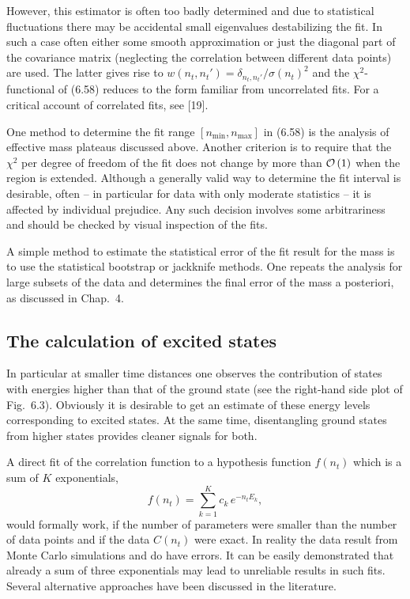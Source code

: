 However, this estimator is often too badly determined and due to statistical
fluctuations there may be accidental small eigenvalues destabilizing the fit. In
such a case often either some smooth approximation or just the diagonal part of
the covariance matrix (neglecting the correlation between different data
points) are used. The latter gives rise to $w(n_t, n_t') =
\delta_{n_t,n_t'}/\sigma(n_t)^2$ and the $\chi^2$-functional of (6.58) reduces
to the form familiar from uncorrelated fits. For a critical account of
correlated fits, see [19].

One method to determine the fit range $[n_{\min}, n_{\max}]$ in (6.58) is the
analysis of effective mass plateaus discussed above. Another criterion is to
require that the $\chi^2$ per degree of freedom of the fit does not change by
more than $\mathcal{O}\left(1\right)$ when the region is extended. Although a generally valid
way to determine the fit interval is desirable, often -- in particular for data
with only moderate statistics -- it is affected by individual prejudice. Any
such decision involves some arbitrariness and should be checked by visual
inspection of the fits.

A simple method to estimate the statistical error of the fit result for the
mass is to use the statistical bootstrap or jackknife methods. One repeats the
analysis for large subsets of the data and determines the final error of the
mass a posteriori, as discussed in Chap.~4.

\subsection{The calculation of excited states}

In particular at smaller time distances one observes the contribution of states
with energies higher than that of the ground state (see the right-hand side
plot of Fig.~6.3). Obviously it is desirable to get an estimate of these energy
levels corresponding to excited states. At the same time, disentangling ground
states from higher states provides cleaner signals for both.

A direct fit of the correlation function to a hypothesis function $f(n_t)$
which is a sum of $K$ exponentials,
\begin{equation}
  f(n_t) = \sum_{k=1}^{K} c_k\, e^{-n_t E_k} ,
\end{equation}
would formally work, if the number of parameters were smaller than the number
of data points and if the data $C(n_t)$ were exact. In reality the data result
from Monte Carlo simulations and do have errors. It can be easily demonstrated
that already a sum of three exponentials may lead to unreliable results in such
fits. Several alternative approaches have been discussed in the literature.

